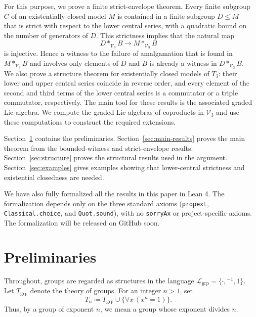 \documentclass[11pt,reqno]{article}
\theoremstyle{definition}
\theoremstyle{remark}
\begin{document}
For this purpose, we prove a finite strict-envelope theorem.
Every finite subgroup $C$ of an existentially closed model $M$ is contained in a finite subgroup $D\leq M$ that is strict with respect to the lower central series, with a quadratic bound on the number of generators of $D$.
This strictness implies that the natural map 
\[ D*_{\mathcal V_3}B\longrightarrow M*_{\mathcal V_3}B \]
is injective.
Hence a witness to the failure of amalgamation that is found in $M*_{\mathcal V_3}B$ and involves
only elements of $D$ and $B$ is already a witness in $D*_{\mathcal V_3}B$.
We also prove a structure theorem for existentially closed models of $T_3$: their lower and upper central series coincide in reverse order, and every element of the second and third terms of the lower central series is a commutator or a triple commutator, respectively.
The main tool for these results is the associated graded Lie algebra.
We compute the graded Lie algebras of coproducts in $\mathcal V_3$ and use these computations to construct the required extensions.

Section~\ref{sec:preliminaries} contains the preliminaries.
Section~\ref{sec:main-results} proves the main theorem from the bounded-witness and strict-envelope results.
Section~\ref{sec:structure} proves the structural results used in the argument.
Section~\ref{sec:examples} gives examples showing that lower-central strictness and existential closedness are needed.

We have also fully formalized all the results in this paper in Lean 4.
The formalization depends only on the three standard axioms
(\texttt{propext}, \texttt{Classical.choice}, and \texttt{Quot.sound}),
with no \texttt{sorryAx} or project-specific axioms.
The formalization will be released on GitHub soon.

\section{Preliminaries}
\label{sec:preliminaries}

Throughout, groups are regarded as structures in the language
$\mathcal{L}_{\mathrm{grp}}=\{\cdot,{}^{-1},1\}$.  Let
$T_{\mathrm{grp}}$ denote the theory of groups.  For an integer $n>1$, set
\[
T_n \coloneqq T_{\mathrm{grp}} \cup \{\forall x\,(x^n=1)\}.
\]
Thus, by a group of exponent $n$, we mean a group whose exponent divides $n$.
\end{document}
